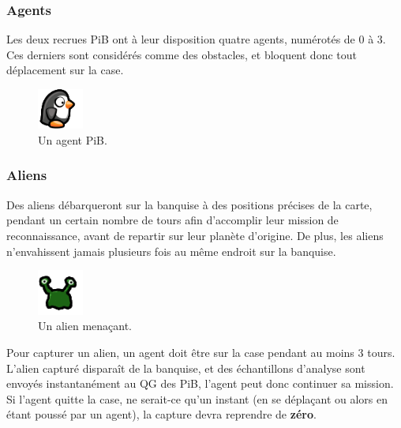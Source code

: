 \subsubsection{Agents}\label{agents}

Les deux recrues PiB ont à leur disposition quatre agents, numérotés de
0 à 3. Ces derniers sont considérés comme des obstacles, et bloquent
donc tout déplacement sur la case.

\begin{figure}[!h]
    \centering
    \includegraphics[width=1.5cm]{img/penguin}
    \caption*{Un agent PiB.}
\end{figure}

\subsubsection{Aliens}\label{aliens}

Des aliens débarqueront sur la banquise à des positions précises de la
carte, pendant un certain nombre de tours afin d'accomplir leur mission
de reconnaissance, avant de repartir sur leur planète d'origine. De
plus, les aliens n'envahissent jamais plusieurs fois au même endroit sur
la banquise.

\begin{figure}[!h]
    \centering
    \includegraphics[width=1.5cm]{img/alien}
    \caption*{Un alien menaçant.}
\end{figure}

Pour capturer un alien, un agent doit être sur la case pendant au moins
3 tours. L'alien capturé disparaît de la banquise, et des échantillons
d'analyse sont envoyés instantanément au QG des PiB, l'agent peut donc
continuer sa mission. Si l'agent quitte la case, ne serait-ce qu'un
instant (en se déplaçant ou alors en étant poussé par un agent), la
capture devra reprendre de \textbf{zéro}.

